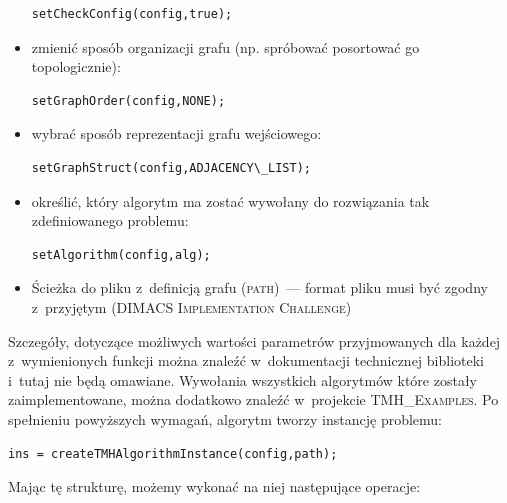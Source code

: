 \begin{itemize}
	\begin{lstlisting}[style=customc]
setCheckConfig(config,true);
	\end{lstlisting}
	\item zmienić sposób organizacji grafu (np. spróbować posortować go topologicznie):
	\begin{lstlisting}[style=customc]
setGraphOrder(config,NONE);
	\end{lstlisting}
	\item wybrać sposób reprezentacji grafu wejściowego:
	\begin{lstlisting}[style=customc]
setGraphStruct(config,ADJACENCY\_LIST);
	\end{lstlisting}
	\item określić, który algorytm ma zostać wywołany do rozwiązania tak zdefiniowanego problemu:
	\begin{lstlisting}[style=customc]
setAlgorithm(config,alg);
	\end{lstlisting}
	\item Ścieżka do pliku z~definicją grafu (\textsc{path})~--- format pliku musi być zgodny z~przyjętym (\textsc{DIMACS Implementation Challenge})
\end{itemize}

Szczegóły, dotyczące możliwych wartości parametrów przyjmowanych dla każdej z~wymienionych funkcji można znaleźć w~dokumentacji technicznej biblioteki i~tutaj nie będą omawiane.
Wywołania wszystkich algorytmów które zostały zaimplementowane, można dodatkowo znaleźć w~projekcie \textsc{TMH\_Examples}.
Po spełnieniu powyższych wymagań, algorytm tworzy instancję problemu:

\begin{lstlisting}[style=customc]
ins = createTMHAlgorithmInstance(config,path);
\end{lstlisting}

Mając tę strukturę, możemy wykonać na niej następujące operacje:

